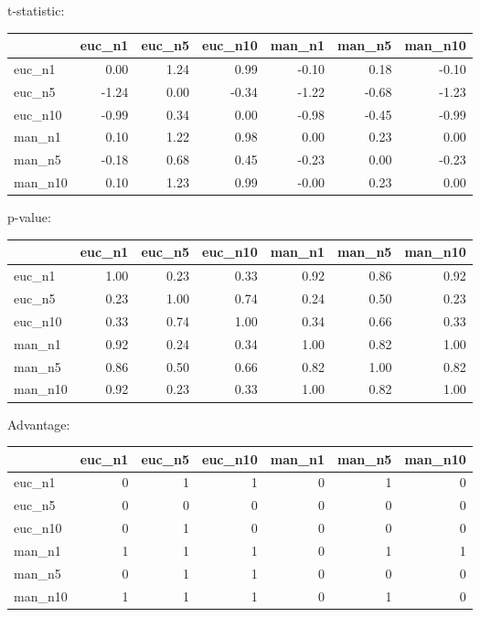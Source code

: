 t-statistic:
 \begin{tabular}{lrrrrrr}
\hline
         &   euc\_n1 &   euc\_n5 &   euc\_n10 &   man\_n1 &   man\_n5 &   man\_n10 \\
\hline
 euc\_n1  &     0.00 &     1.24 &      0.99 &    -0.10 &     0.18 &     -0.10 \\
 euc\_n5  &    -1.24 &     0.00 &     -0.34 &    -1.22 &    -0.68 &     -1.23 \\
 euc\_n10 &    -0.99 &     0.34 &      0.00 &    -0.98 &    -0.45 &     -0.99 \\
 man\_n1  &     0.10 &     1.22 &      0.98 &     0.00 &     0.23 &      0.00 \\
 man\_n5  &    -0.18 &     0.68 &      0.45 &    -0.23 &     0.00 &     -0.23 \\
 man\_n10 &     0.10 &     1.23 &      0.99 &    -0.00 &     0.23 &      0.00 \\
\hline
\end{tabular} 

p-value:
 \begin{tabular}{lrrrrrr}
\hline
         &   euc\_n1 &   euc\_n5 &   euc\_n10 &   man\_n1 &   man\_n5 &   man\_n10 \\
\hline
 euc\_n1  &     1.00 &     0.23 &      0.33 &     0.92 &     0.86 &      0.92 \\
 euc\_n5  &     0.23 &     1.00 &      0.74 &     0.24 &     0.50 &      0.23 \\
 euc\_n10 &     0.33 &     0.74 &      1.00 &     0.34 &     0.66 &      0.33 \\
 man\_n1  &     0.92 &     0.24 &      0.34 &     1.00 &     0.82 &      1.00 \\
 man\_n5  &     0.86 &     0.50 &      0.66 &     0.82 &     1.00 &      0.82 \\
 man\_n10 &     0.92 &     0.23 &      0.33 &     1.00 &     0.82 &      1.00 \\
\hline
\end{tabular} 

Advantage:
 \begin{tabular}{lrrrrrr}
\hline
         &   euc\_n1 &   euc\_n5 &   euc\_n10 &   man\_n1 &   man\_n5 &   man\_n10 \\
\hline
 euc\_n1  &        0 &        1 &         1 &        0 &        1 &         0 \\
 euc\_n5  &        0 &        0 &         0 &        0 &        0 &         0 \\
 euc\_n10 &        0 &        1 &         0 &        0 &        0 &         0 \\
 man\_n1  &        1 &        1 &         1 &        0 &        1 &         1 \\
 man\_n5  &        0 &        1 &         1 &        0 &        0 &         0 \\
 man\_n10 &        1 &        1 &         1 &        0 &        1 &         0 \\
\hline
\end{tabular} 

